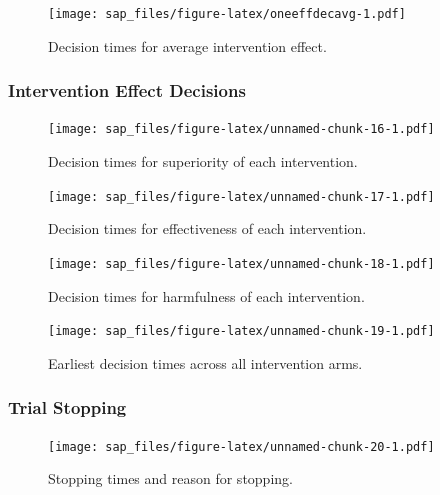 \documentclass[
  bibliography=totoc]{scrreprt}
\begin{document}
\begin{figure}
\centering
\texttt{[image: sap\_files/figure-latex/oneeffdecavg-1.pdf]}
\caption{\label{fig:oneeffdecavg}Decision times for average intervention effect.}
\end{figure}

\hypertarget{intervention-effect-decisions-1}{%
\subsubsection{Intervention Effect Decisions}\label{intervention-effect-decisions-1}}

\begin{figure}
\centering
\texttt{[image: sap\_files/figure-latex/unnamed-chunk-16-1.pdf]}
\caption{\label{fig:unnamed-chunk-16}Decision times for superiority of each intervention.}
\end{figure}

\begin{figure}
\centering
\texttt{[image: sap\_files/figure-latex/unnamed-chunk-17-1.pdf]}
\caption{\label{fig:unnamed-chunk-17}Decision times for effectiveness of each intervention.}
\end{figure}

\begin{figure}
\centering
\texttt{[image: sap\_files/figure-latex/unnamed-chunk-18-1.pdf]}
\caption{\label{fig:unnamed-chunk-18}Decision times for harmfulness of each intervention.}
\end{figure}

\begin{figure}
\centering
\texttt{[image: sap\_files/figure-latex/unnamed-chunk-19-1.pdf]}
\caption{\label{fig:unnamed-chunk-19}Earliest decision times across all intervention arms.}
\end{figure}

\clearpage

\hypertarget{trial-stopping-1}{%
\subsubsection{Trial Stopping}\label{trial-stopping-1}}

\begin{figure}
\centering
\texttt{[image: sap\_files/figure-latex/unnamed-chunk-20-1.pdf]}
\caption{\label{fig:unnamed-chunk-20}Stopping times and reason for stopping.}
\end{figure}

\clearpage
\end{document}
